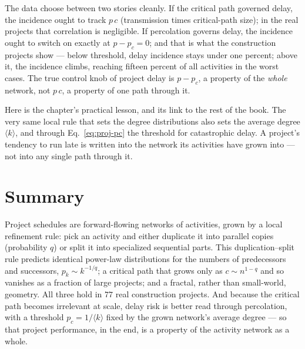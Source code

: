 The data choose between two stories cleanly. If the critical path governed
delay, the incidence ought to track $p\,c$ (transmission times critical-path
size); in the real projects that correlation is negligible. If percolation
governs delay, the incidence ought to switch on exactly at $p-p_c=0$; and that is
what the construction projects show --- below threshold, delay incidence stays
under one percent; above it, the incidence climbs, reaching fifteen percent of
all activities in the worst cases. The true control knob of project delay is
$p-p_c$, a property of the \emph{whole} network, not $p\,c$, a property of one
path through it.

Here is the chapter's practical lesson, and its link to the rest of the book. The
very same local rule that sets the degree distributions also sets the average
degree $\langle k\rangle$, and through Eq.~\eqref{eq:proj-pc} the threshold for
catastrophic delay. A project's tendency to run late is written into the network
its activities have grown into --- not into any single path through it.

\section{Summary}

Project schedules are forward-flowing networks of activities, grown by a local
refinement rule: pick an activity and either duplicate it into parallel copies
(probability $q$) or split it into specialized sequential parts. This
duplication--split rule predicts identical power-law distributions for the
numbers of predecessors and successors, $p_k\sim k^{-1/q}$; a critical path that
grows only as $c\sim n^{1-q}$ and so vanishes as a fraction of large projects;
and a fractal, rather than small-world, geometry. All three hold in $77$ real
construction projects. And because the critical path becomes irrelevant at scale,
delay risk is better read through percolation, with a threshold $p_c=1/\langle
k\rangle$ fixed by the grown network's average degree --- so that project
performance, in the end, is a property of the activity network as a whole.
